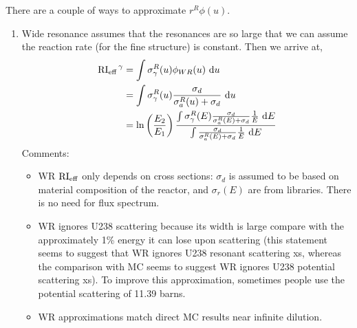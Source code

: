 \documentclass{school-22.211-notes}
\begin{document}
There are a couple of ways to approximate $r^R \phi(u)$. 
\begin{enumerate}
\item Wide resonance assumes that the resonances are so large that we can assume the reaction rate (for the fine structure) is constant. 
Then we arrive at, 
\begin{align}
\left. \mathrm{RI}_{\mathrm{eff}} \right.^{\gamma} &= \int \sigma_{\gamma}^R (u) \phi_{WR} (u) \mbox{ }\mathrm{d} u \\
&= \int \sigma_{\gamma}^R (u) \frac{\sigma_d}{\sigma_a^R(u) + \sigma_d} \mbox{ }\mathrm{d} u \\
&= \ln\left( \frac{E_2}{E_1} \right) \frac{ \int \sigma_{\gamma}^R (E) \frac{\sigma_d}{\sigma_{a}^R(E) + \sigma_d} \frac{1}{E} \mbox{ }\mathrm{d} E}{ \int \frac{\sigma_d}{\sigma_{a}^R(E) + \sigma_d} \frac{1}{E} \mbox{ }\mathrm{d} E}
\end{align}
Comments:
\begin{itemize}
\item WR $\mathrm{RI}_{\mathrm{eff}}$ only depends on cross sections: $\sigma_d$ is assumed to be based on material composition of the reactor, and $\sigma_r(E)$ are from libraries. There is no need for flux spectrum. 

\item WR ignores U238 scattering because its width is large compare with the approximately 1\% energy it can lose upon scattering (this statement seems to suggest that WR ignores U238 resonant scattering xs, whereas the comparison with MC seems to suggest WR ignores U238 potential scattering xs). To improve this approximation, sometimes people use the potential scattering of 11.39 barns. 

\item WR approximations match direct MC results near infinite dilution. 
\end{itemize}




\end{enumerate}
\end{document}
